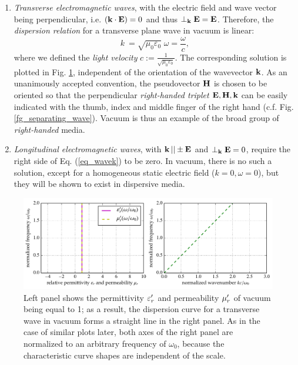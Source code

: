 \begin{enumerate}
 \item{\textit{Transverse electromagnetic waves}, with the electric field and wave vector being perpendicular, i.e. $({\mathbf{k}} \cdot \mathbf{E}) = 0$ and thus $\perp_{\mathbf{k}}\mathbf{E} = \mathbf{E}$. Therefore, the \textit{dispersion relation} for a transverse plane wave in vacuum is linear:
\begin{equation} k~= \sqrt{\mu_0 \varepsilon_0}\; \omega = \frac{\omega}{c}, \label{eq_dispeq_vac}\end{equation}
	where we defined the \textit{light velocity} $c := \frac{1}{\sqrt{\mu_0 \varepsilon_0}}$. The corresponding solution is plotted in Fig. \ref{fg_dcvac}, independent of the orientation of the wavevector ${\mathbf{k}}$. As an unanimously accepted convention, the pseudovector $\mathbf{H}$ is chosen to be oriented so that the perpendicular \textit{right-handed triplet} $\mathbf{E},\mathbf{H},{\mathbf{k}}$ can be easily indicated with the thumb, index and middle finger of the right hand (c.f. Fig. \ref{fg_separating_wave}). Vacuum is thus an example of the broad group of \textit{right-handed} media.
} 
 \item{\textit{Longitudinal electromagnetic waves}, with ${\mathbf{k}}\,|| \pm \mathbf{E}$ and $\perp_{\mathbf{k}}\mathbf{E} = 0$, require the right side of Eq. (\ref{eq_wavek}) to be zero. In vacuum, there is no such a solution, except for a homogeneous static electric field ($k = 0, \omega = 0$), but they will be shown to exist in dispersive media.} 
 \end{enumerate}

 \begin{figure}[t] \caption{Left panel shows the permittivity $\varepsilon_r'$ and permeability $\mu_r'$ of vacuum being equal to 1; as a result, the dispersion curve for a transverse wave in vacuum forms a straight line in the right panel. As in the case of similar plots later, both axes of the right panel are normalized to an arbitrary frequency of $\omega_0$, because the characteristic curve shapes are independent of the scale.} \label{fg_dcvac} \centering 
	\includegraphics[width=\textwidth]{img/dispersion_landau_lifshitz/dispersion_vacuum.pdf}
\end{figure}

